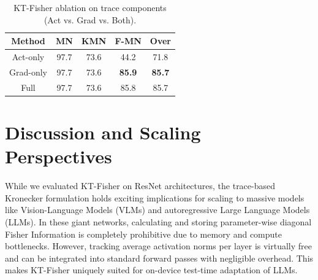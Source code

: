 \documentclass{article}
\theoremstyle{plain}
\theoremstyle{definition}
\theoremstyle{remark}
\begin{document}
\begin{table}[t]
\begin{minipage}{0.32\textwidth}
\caption{KT-Fisher ablation on trace components (Act vs. Grad vs. Both).}
\label{tab:ablation_components}
\vskip 0.15in
\begin{center}
\begin{small}
\begin{sc}
\begin{tabular}{ccccc}
\toprule
Method & MN & KMN & F-MN & Over \\
\midrule
Act-only  & 97.7 & 73.6 & 44.2 & 71.8 \\
Grad-only & 97.7 & 73.6 & \textbf{85.9} & \textbf{85.7} \\
Full      & 97.7 & 73.6 & 85.8 & 85.7 \\
\bottomrule
\end{tabular}
\end{sc}
\end{small}
\end{center}
\end{minipage}
\end{table}

\section{Discussion and Scaling Perspectives}
While we evaluated KT-Fisher on ResNet architectures, the trace-based Kronecker formulation holds exciting implications for scaling to massive models like Vision-Language Models (VLMs) and autoregressive Large Language Models (LLMs). In these giant networks, calculating and storing parameter-wise diagonal Fisher Information is completely prohibitive due to memory and compute bottlenecks. However, tracking average activation norms per layer is virtually free and can be integrated into standard forward passes with negligible overhead. This makes KT-Fisher uniquely suited for on-device test-time adaptation of LLMs.
\end{document}

